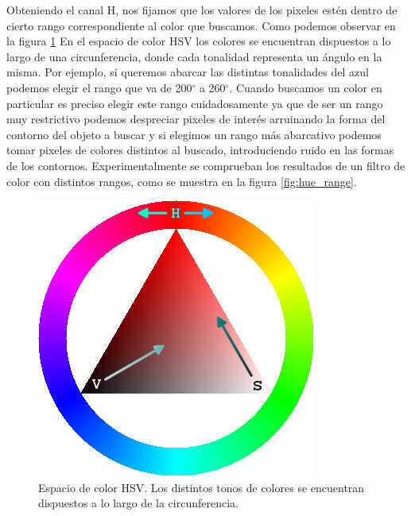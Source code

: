 Obteniendo el canal H, nos fijamos que los valores de los pixeles estén dentro de cierto rango correspondiente al color que buscamos. Como podemos observar en la figura \ref{fig:hsv_space} En el espacio de color HSV los colores se encuentran dispuestos a lo largo de una circunferencia, donde cada tonalidad representa un ángulo en la misma. Por ejemplo, si queremos abarcar las distintas tonalidades del azul podemos elegir el rango que va de 200$^\circ$ a 260$^\circ$. Cuando buscamos un color en particular  es preciso elegir este rango cuidadosamente ya que de ser un rango muy restrictivo podemos despreciar pixeles de interés arruinando la forma del contorno del objeto a buscar y si elegimos un rango más abarcativo podemos tomar pixeles de colores distintos al buscado, introduciendo ruido en las formas de los contornos. Experimentalmente se comprueban los resultados de un filtro de color con distintos rangos, como se muestra  en la figura \ref{fig:hue_range}.
\begin{figure}[tpb]
\begin{center}
  \includegraphics[scale=0.4]{figuras/hsv_triangle.png}
\end{center}
  \caption{\small Espacio de color HSV. Los distintos tonos de colores se encuentran dispuestos a lo largo de la circunferencia.}
  \label{fig:hsv_space}
\end{figure}

